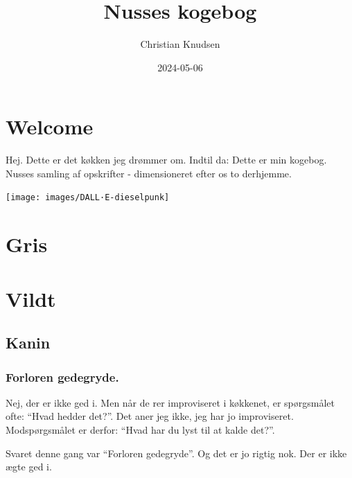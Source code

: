 \documentclass[
]{book}
\title{Nusses kogebog}
\author{Christian Knudsen}
\date{2024-05-06}
\begin{document}
\maketitle

{
\setcounter{tocdepth}{1}
\tableofcontents
}
\chapter{Welcome}\label{welcome}

Hej. Dette er det køkken jeg drømmer om. Indtil da:
Dette er min kogebog. Nusses samling af opskrifter - dimensioneret efter os to derhjemme.

\texttt{[image: images/DALL·E-dieselpunk]}

\chapter{Gris}\label{gris}

\chapter{Vildt}\label{vildt}

\section{Kanin}\label{kanin}

\subsection{Forloren gedegryde.}\label{forloren-gedegryde.}

Nej, der er ikke ged i. Men når de rer improviseret i køkkenet, er spørgsmålet
ofte: ``Hvad hedder det?''. Det aner jeg ikke, jeg har jo improviseret.
Modspørgsmålet er derfor: ``Hvad har du lyst til at kalde det?''.

Svaret denne gang var ``Forloren gedegryde''. Og det er jo rigtig nok. Der er ikke
ægte ged i.
\end{document}
